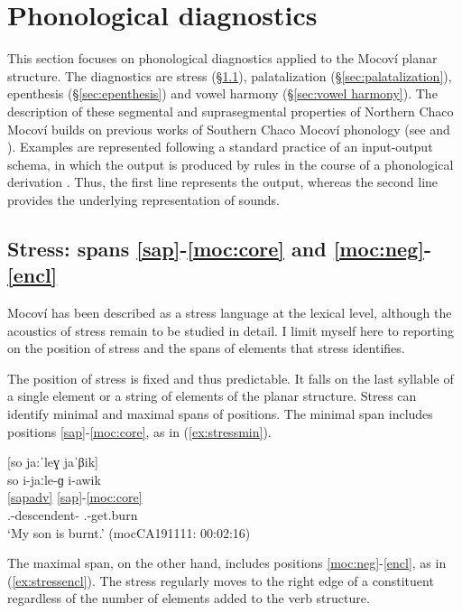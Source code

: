 \documentclass[output=paper]{langscibook}
\begin{document}
\section{Phonological diagnostics} 
\label{sec:phonologicaltest}

This section focuses on phonological diagnostics applied to the Mocoví planar structure. The diagnostics are stress (\S \ref{sec:stress}), palatalization (\S\ref{sec:palatalization}), epenthesis (\S \ref{sec:epenthesis}) and vowel harmony (\S\ref{sec:vowel harmony}). The description of these segmental and suprasegmental properties of Northern Chaco Mocoví  builds on previous works of Southern Chaco Mocoví phonology (see \citealt[chap.2]{Gualdieri1998} and \citealt[21--42]{Grondona1998}). Examples are represented following a standard practice of an input-output schema, in which the output is produced by rules in the course of a phonological derivation \citep{Hayes, Gussenhoven2011, Kenstowicz1979}. Thus, the first line represents the output, whereas the second line provides the underlying representation of sounds.   

\subsection{Stress: spans \ref{sap}-\ref{moc:core} and \ref{moc:neg}-\ref{encl}}\label{sec:stress}
Mocoví has been described as a stress language at the lexical level, although the acoustics of stress remain to be studied in detail. I limit myself here to reporting on the position of stress and the spans of elements that stress identifies.

The position of stress is fixed and thus predictable. It falls on the last syllable of a single element or a string of elements of the planar structure. Stress can identify minimal and maximal spans of positions. The minimal span includes positions \ref{sap}-\ref{moc:core}, as in (\ref{ex:stressmin}).  

\ea \label{ex:stressmin}
 [so ja:ˈleɣ jaˈβik]\\
\glll so i-jaːle-ɡ i-awik\\
\ref{sapadv} {} \ref{sap}-\ref{moc:core}\\
{\DetTwo} {\First\Sg.\Poss}-descendent-{\M} {\Third.\I}-get.burn\\
\glt `My son is burnt.' \hfill(mocCA191111: 00:02:16)
\z

The maximal span, on the other hand, includes positions \ref{moc:neg}-\ref{encl}, as in (\ref{ex:stressencl}). The stress regularly moves to the right edge of a constituent regardless of the number of elements added to the verb structure. 
 
\end{document}
